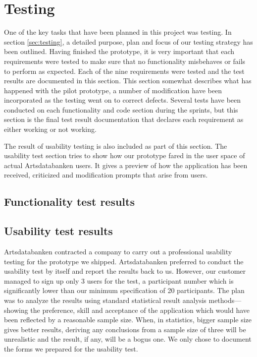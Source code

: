 \section{Testing}
\label{sec:testresult}

One of the key tasks that have been planned in this project was testing. In
section \ref{sec:testing}, a detailed purpose, plan and focus of our testing
strategy has been outlined. Having finished the prototype, it is very important
that each requirements were tested to make sure that no functionality
misbehaves or fails to perform as expected. Each of the nine requirements were
tested and the test results are documented in this section. This section
somewhat describes what has happened with the pilot prototype, a number of
modification have been incorporated as the testing went on to correct defects.
Several tests have been conducted on each functionality and code section during
the sprints, but this section is the final test result documentation that
declares each requirement as either working or not working.

The result of usability testing is also included as part of this section. The
usability test section tries to show how our prototype fared in the user space
of actual Artsdatabanken users. It gives a preview of how the application has
been received, criticized and modification prompts that arise from users.

\subsection{Functionality test results}






\subsection{Usability test results}

Artsdatabanken contracted a company to carry out a professional usability
testing for the prototype we shipped. Artsdatabanken preferred to conduct the
usability test by itself and report the results back to us. However, our
customer managed to sign up only 3 users for the test, a participant number
which is significantly lower than our minimum specification of 20 participants.
The plan was to analyze the results using standard statistical result analysis
methods---showing the preference, skill and acceptance of the application which
would have been reflected by a reasonable sample size. When, in statistics,
bigger sample size gives better results\cite{statistics}, deriving any
conclusions from a sample size of three will be unrealistic and the result, if
any, will be a bogus one. We only chose to document the forms we prepared for
the usability test.


